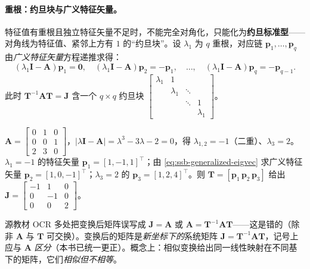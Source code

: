 \paragraph{重根：约旦块与广义特征矢量。}
特征值有重根且独立特征矢量不足时，不能完全对角化，只能化为\textbf{约旦标准型}——对角线为特征值、紧邻上方有 $1$ 的“约旦块”。设 $\lambda_1$ 为 $q$ 重根，对应链 $\mathbf{p}_1,\dots,\mathbf{p}_q$ 由\emph{广义特征矢量}方程递推求得\cite{liubao2006modern}：
\begin{equation}
  (\lambda_1\mathbf{I}-\mathbf{A})\mathbf{p}_1=\mathbf{0},\quad (\lambda_1\mathbf{I}-\mathbf{A})\mathbf{p}_2=-\mathbf{p}_1,\quad\dots,\quad (\lambda_1\mathbf{I}-\mathbf{A})\mathbf{p}_q=-\mathbf{p}_{q-1}.
  \label{eq:ssb-generalized-eigvec}
\end{equation}
此时 $\mathbf{T}^{-1}\mathbf{A}\mathbf{T}=\mathbf{J}$ 含一个 $q\times q$ 约旦块 $\begin{bmatrix}\lambda_1&1\\&\lambda_1&\ddots\\&&\ddots&1\\&&&\lambda_1\end{bmatrix}$。

\begin{example}[化约旦型]\label{ex:ssb-jordan}
$\mathbf{A}=\begin{bmatrix}0&1&0\\0&0&1\\2&3&0\end{bmatrix}$，$|\lambda\mathbf{I}-\mathbf{A}|=\lambda^3-3\lambda-2=0$，得 $\lambda_{1,2}=-1$（二重）、$\lambda_3=2$。$\lambda_1=-1$ 的特征矢量 $\mathbf{p}_1=[1,-1,1]^\top$；由 \cref{eq:ssb-generalized-eigvec} 求广义特征矢量 $\mathbf{p}_2=[1,0,-1]^\top$；$\lambda_3=2$ 的 $\mathbf{p}_3=[1,2,4]^\top$。则 $\mathbf{T}=[\mathbf{p}_1\,\mathbf{p}_2\,\mathbf{p}_3]$ 给出
$\mathbf{J}=\begin{bmatrix}-1&1&0\\0&-1&0\\0&0&2\end{bmatrix}$。
\end{example}

\begin{pitfall}[概念误区：约旦型“$\mathbf{J}=\mathbf{A}$”]
源教材 OCR 多处把变换后矩阵误写成 $\mathbf{J}=\mathbf{A}$ 或 $\mathbf{A}=\mathbf{T}^{-1}\mathbf{A}\mathbf{T}$\cite{liubao2006modern}——这是错的（除非 $\mathbf{A}$ 与 $\mathbf{T}$ 可交换）。变换后的矩阵是\emph{新坐标下的}系统矩阵 $\mathbf{J}=\mathbf{T}^{-1}\mathbf{A}\mathbf{T}$，记号上应与 $\mathbf{A}$ \emph{区分}（本书已统一更正）。概念上：相似变换给出同一线性映射在不同基下的矩阵，它们\emph{相似但不相等}。
\end{pitfall}

